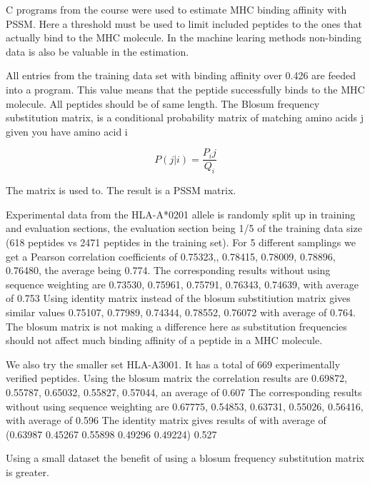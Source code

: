 
C programs from the course were used to estimate MHC binding affinity with PSSM. 
Here a threshold must be used to limit included peptides to the ones that actually bind to the MHC molecule. 
In the machine learing methods non-binding data is also be valuable in the estimation.

All entries from the training data set with binding affinity over 0.426 are feeded into a program. 
This value means that the peptide successfully binds to the MHC molecule. All peptides should be of same length.
The Blosum frequency substitution matrix, is a
conditional probability matrix of matching amino
acids j given you have amino acid i

\begin{equation}
P(j|i) = \frac{P_ij}{Q_i}
\end{equation}

The matrix is used to. The result is a PSSM matrix. 

Experimental data from the HLA-A*0201 allele is randomly split up in training and evaluation sections, the evaluation section being 1/5 of the training data size (618 peptides vs 2471 peptides in the training set).
For 5 different samplings we get a Pearson correlation coefficients of {0.75323,, 0.78415, 0.78009, 0.78896, 0.76480}, the average being 0.774.
The corresponding results without using sequence weighting are {0.73530, 0.75961, 0.75791, 0.76343, 0.74639}, with average of 0.753
Using identity matrix instead of the blosum substitiution matrix gives similar values {0.75107, 0.77989, 0.74344, 0.78552, 0.76072} with average of 0.764.
The blosum matrix is not making a difference here as substitution frequencies should not affect much binding affinity of a peptide in a MHC molecule.

We also try the smaller set HLA-A3001. It has a total of 669 experimentally verified peptides.
Using the blosum matrix the correlation results are {0.69872, 0.55787, 0.65032, 0.55827, 0.57044}, an average of 0.607
The corresponding results without using sequence weighting are {0.67775, 0.54853, 0.63731, 0.55026, 0.56416}, with average of 0.596
The identity matrix gives results of with average of (0.63987 0.45267 0.55898 0.49296 0.49224) 0.527 

Using a small dataset the benefit of using a blosum frequency substitution matrix is greater.



